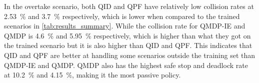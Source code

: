 In the overtake scenario, both QID and QPF have relatively low collision rates at \SI{2.53}{\percent} and \SI{3.7}{\percent} respectively, which is lower when compared to the trained scenarios in \ref{tab:results_summary}. 
While the collision rate for QMDP-IE and QMDP is \SI{4.6}{\percent} and \SI{5.95}{\percent} respectively, which is higher than what they got on the trained scenario but it is also higher than QID and QPF. This indicates that QID and QPF are better at handling some scenarios outside the training set than QMDP-IE and QMDP.
QMDP also has the highest safe stop and deadlock rate at \SI{10.2}{\percent} and \SI{4.15}{\percent}, making it the most passive policy. 